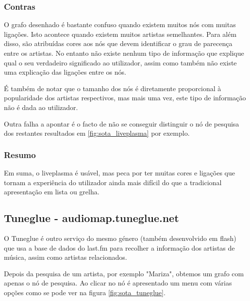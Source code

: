 
\subsubsection{Contras} %
\label{ssub:liveplasma_contras}

O grafo desenhado é bastante confuso quando existem muitos nós com muitas ligações.
Isto acontece quando existem muitos artistas semelhantes.
Para além disso, são atribuídas cores aos nós que devem identificar o grau de parecença entre os artistas.
No entanto não existe nenhum tipo de informação que explique qual o seu verdadeiro significado ao utilizador, assim como também não existe uma explicação das ligações entre os nós.

É também de notar que o tamanho dos nós é diretamente proporcional à popularidade dos artistas respectivos, mas mais uma vez, este tipo de informação não é dada ao utilizador.

Outra falha a apontar é o facto de não se conseguir distinguir o nó de pesquisa dos restantes resultados em \ref{fig:sota_liveplasma} por exemplo.


\subsubsection{Resumo} %
\label{ssub:liveplasma_resumo}

Em suma, o liveplasma é usável, mas peca por ter muitas cores e ligações que tornam a experiência do utilizador ainda mais difícil do que a tradicional apresentação em lista ou grelha.



\subsection{Tuneglue - audiomap.tuneglue.net} %
\label{sub:tuneglue}

O Tuneglue é outro serviço do mesmo género (também desenvolvido em flash) que usa a base de dados do last.fm para recolher a informação dos artistas de música, assim como artistas relacionados.

Depois da pesquisa de um artista, por exemplo "Mariza", obtemos um grafo com apenas o nó de pesquisa. Ao clicar no nó é apresentado um menu com várias opções como se pode ver na figura \ref{fig:sota_tuneglue}.

